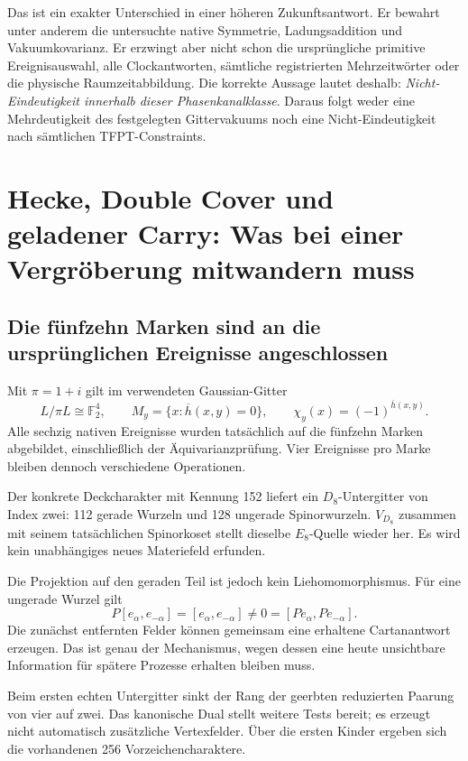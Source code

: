 Das ist ein exakter Unterschied in einer höheren Zukunftsantwort. Er bewahrt unter anderem die untersuchte native Symmetrie, Ladungsaddition und Vakuumkovarianz. Er erzwingt aber nicht schon die ursprüngliche primitive Ereignisauswahl, alle Clockantworten, sämtliche registrierten Mehrzeitwörter oder die physische Raumzeitabbildung. Die korrekte Aussage lautet deshalb: \emph{Nicht-Eindeutigkeit innerhalb dieser Phasenkanalklasse}. Daraus folgt weder eine Mehrdeutigkeit des festgelegten Gittervakuums noch eine Nicht-Eindeutigkeit nach sämtlichen TFPT-Constraints.

\section{Hecke, Double Cover und geladener Carry: Was bei einer Vergröberung mitwandern muss}\label{sec:carry}

\subsection{Die fünfzehn Marken sind an die ursprünglichen Ereignisse angeschlossen}
Mit $\pi=1+i$ gilt im verwendeten Gaussian-Gitter
\begin{equation}
L/\pi L\cong\mathbb F_2^4,\qquad
M_y=\{x:\overline h(x,y)=0\},\qquad
\chi_y(x)=(-1)^{\overline h(x,y)}.
\end{equation}
Alle sechzig nativen Ereignisse wurden tatsächlich auf die fünfzehn Marken abgebildet, einschließlich der Äquivarianzprüfung. Vier Ereignisse pro Marke bleiben dennoch verschiedene Operationen.

Der konkrete Deckcharakter mit Kennung 152 liefert ein $D_8$-Untergitter von Index zwei: 112 gerade Wurzeln und 128 ungerade Spinorwurzeln. $V_{D_8}$ zusammen mit seinem tatsächlichen Spinorkoset stellt dieselbe $E_8$-Quelle wieder her. Es wird kein unabhängiges neues Materiefeld erfunden.

Die Projektion auf den geraden Teil ist jedoch kein Liehomomorphismus. Für eine ungerade Wurzel gilt
\begin{equation}
P[e_\alpha,e_{-\alpha}]=[e_\alpha,e_{-\alpha}]
\ne0=[Pe_\alpha,Pe_{-\alpha}].
\end{equation}
Die zunächst entfernten Felder können gemeinsam eine erhaltene Cartanantwort erzeugen. Das ist genau der Mechanismus, wegen dessen eine heute unsichtbare Information für spätere Prozesse erhalten bleiben muss.

Beim ersten echten Untergitter sinkt der Rang der geerbten reduzierten Paarung von vier auf zwei. Das kanonische Dual stellt weitere Tests bereit; es erzeugt nicht automatisch zusätzliche Vertexfelder. Über die ersten Kinder ergeben sich die vorhandenen 256 Vorzeichencharaktere.

